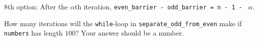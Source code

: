 \begin{prob}
\begin{subprobset}
\begin{subprob}
\begin{soln}
                8th option: After the $\alpha$th iteration, \texttt{even_barrier - odd_barrier = n - 1 - } $\alpha$.

            \end{soln}

        \end{subprob}

        \begin{subprob}
            How many iterations will the \texttt{while}-loop in
            \texttt{separate_odd_from_even} make if \texttt{numbers} has length
            $100$? Your answer should be a number.

        \end{subprob}

    \end{subprobset}

\end{prob}
